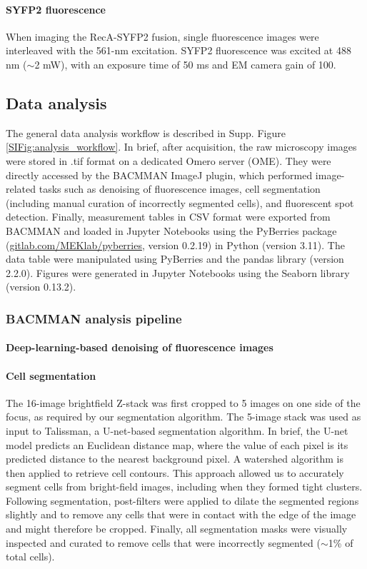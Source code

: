 \paragraph{SYFP2 fluorescence} When imaging the RecA-SYFP2 fusion, single fluorescence images were interleaved with the 561-nm excitation. SYFP2 fluorescence was excited at 488 nm ($\sim$2 mW), with an exposure time of 50 ms and EM camera gain of 100.


\subsection*{Data analysis}
The general data analysis workflow is described in Supp. Figure \ref{SIFig:analysis_workflow}. In brief, after acquisition, the raw microscopy images were stored in .tif format on a dedicated Omero server (OME). They were directly accessed by the BACMMAN ImageJ plugin\cite{}, which performed image-related tasks such as denoising of fluorescence images, cell segmentation (including manual curation of incorrectly segmented cells), and fluorescent spot detection. Finally, measurement tables in CSV format were exported from BACMMAN and loaded in Jupyter Notebooks using the PyBerries package (\href{gitlab.com/MEKlab/pyberries}{gitlab.com/MEKlab/pyberries}, version 0.2.19) in Python (version 3.11). The data table were manipulated using PyBerries and the pandas library (version 2.2.0). Figures were generated in Jupyter Notebooks using the Seaborn library (version 0.13.2).

\subsubsection*{BACMMAN analysis pipeline}
\paragraph*{Deep-learning-based denoising of fluorescence images}

\paragraph{Cell segmentation}
The 16-image brightfield Z-stack was first cropped to 5 images on one side of the focus, as required by our segmentation algorithm. The 5-image stack was used as input to Talissman, a U-net-based segmentation algorithm. In brief, the U-net model predicts an Euclidean distance map, where the value of each pixel is its predicted distance to the nearest background pixel. A watershed algorithm is then applied to retrieve cell contours. This approach allowed us to accurately segment cells from bright-field images, including when they formed tight clusters. Following segmentation, post-filters were applied to dilate the segmented regions slightly and to remove any cells that were in contact with the edge of the image and might therefore be cropped. Finally, all segmentation masks were visually inspected and curated to remove cells that were incorrectly segmented ($\sim$1\% of total cells).

